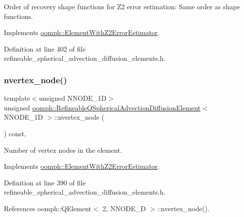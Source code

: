 Order of recovery shape functions for Z2 error estimation\+: Same order as shape functions. 



Implements \hyperlink{classoomph_1_1ElementWithZ2ErrorEstimator_af39480835bd3e0f6b2f4f7a9a4044798}{oomph\+::\+Element\+With\+Z2\+Error\+Estimator}.



Definition at line 402 of file refineable\+\_\+spherical\+\_\+advection\+\_\+diffusion\+\_\+elements.\+h.

\mbox{\label{classoomph_1_1RefineableQSphericalAdvectionDiffusionElement_afcf743949d8dfc8d67cdd980294e7840}} 
\subsubsection{\texorpdfstring{nvertex\+\_\+node()}{nvertex\_node()}}
{\footnotesize\ttfamily template$<$unsigned N\+N\+O\+D\+E\+\_\+1D$>$ \\
unsigned \hyperlink{classoomph_1_1RefineableQSphericalAdvectionDiffusionElement}{oomph\+::\+Refineable\+Q\+Spherical\+Advection\+Diffusion\+Element}$<$ N\+N\+O\+D\+E\+\_\+1D $>$\+::nvertex\+\_\+node (\begin{DoxyParamCaption}{ }\end{DoxyParamCaption}) const\hspace{0.3cm}{\ttfamily [inline]}, {\ttfamily [virtual]}}



Number of vertex nodes in the element. 



Implements \hyperlink{classoomph_1_1ElementWithZ2ErrorEstimator_a19495a0e77ef4ff35f15fdf7913b4077}{oomph\+::\+Element\+With\+Z2\+Error\+Estimator}.



Definition at line 390 of file refineable\+\_\+spherical\+\_\+advection\+\_\+diffusion\+\_\+elements.\+h.



References oomph\+::\+Q\+Element$<$ 2, N\+N\+O\+D\+E\+\_\+D $>$\+::nvertex\+\_\+node().

